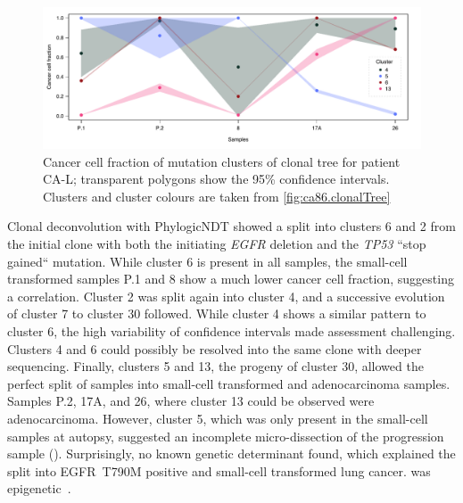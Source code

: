 \begin{figure}[ht]
\centering
\includegraphics[width=.99\linewidth]{Figures/CASCADE/CA86/CA86.ccf_cluster.pdf}
\caption[Cancer cell fraction of mutation clusters of clonal tree for patient CA-L]{Cancer cell fraction of mutation clusters of clonal tree for patient CA-L; transparent polygons show the 95\% confidence intervals. Clusters and cluster colours are taken from \protect\autoref{fig:ca86.clonalTree}} \label{fig:ca86.ccfCluster}
\end{figure}



Clonal deconvolution with PhylogicNDT showed a split into clusters 6 and 2 from the initial clone with both the initiating \textit{EGFR} deletion and the \textit{TP53} ``stop gained`` mutation. While cluster 6 is present in all samples, the small-cell transformed samples P.1 and 8 show a much lower cancer cell fraction, suggesting a correlation. Cluster 2 was  split again into cluster 4, and a successive evolution of cluster 7 to cluster 30 followed. While cluster 4 shows a similar pattern to cluster 6, the high variability of confidence intervals made  assessment challenging. Clusters 4 and 6 could possibly be resolved into the same clone with deeper sequencing. Finally, clusters 5 and 13, the progeny of cluster 30, allowed the perfect split of samples into small-cell transformed and adenocarcinoma samples. Samples P.2, 17A, and 26, where  cluster 13 could be observed were adenocarcinoma. However,  cluster 5, which was only present in the small-cell samples at autopsy, suggested an incomplete micro-dissection of the progression sample (). Surprisingly,  no known genetic determinant  found, which explained the split into EGFR~T790M positive and small-cell transformed lung cancer.  was epigenetic~\cite{Fennell2021,Suva2013}.



\cleardoublepage